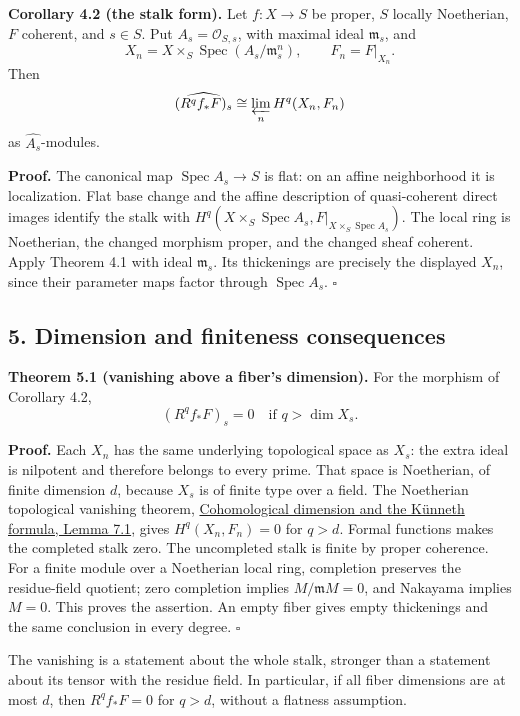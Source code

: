 \documentclass[11pt]{article}
\begin{document}
\textbf{Corollary 4.2 (the stalk form).} Let \(f:X\to S\) be proper,
\(S\) locally Noetherian, \(F\) coherent, and \(s\in S\). Put
\(A_s=\mathcal O_{S,s}\), with maximal ideal \(\mathfrak m_s\), and \[
X_n=X\times_S\operatorname{Spec}(A_s/\mathfrak m_s^n),\qquad F_n=F|_{X_n}.
\] Then \[
\widehat{(R^qf_*F)_s}\cong\varprojlim_n H^q(X_n,F_n)
\] as \(\widehat{A_s}\)-modules.

\textbf{Proof.} The canonical map \(\operatorname{Spec}A_s\to S\) is
flat: on an affine neighborhood it is localization. Flat base change and
the affine description of quasi-coherent direct images identify the
stalk with
\(H^q(X\times_S\operatorname{Spec}A_s,F|_{X\times_S\operatorname{Spec}A_s})\).
The local ring is Noetherian, the changed morphism proper, and the
changed sheaf coherent. Apply Theorem 4.1 with ideal \(\mathfrak m_s\).
Its thickenings are precisely the displayed \(X_n\), since their
parameter maps factor through \(\operatorname{Spec}A_s\). \(\square\)

\subsection{5. Dimension and finiteness
consequences}\label{dimension-and-finiteness-consequences}

\textbf{Theorem 5.1 (vanishing above a fiber's dimension).} For the
morphism of Corollary 4.2, \[
(R^qf_*F)_s=0\quad\text{if }q>\dim X_s.
\]

\textbf{Proof.} Each \(X_n\) has the same underlying topological space
as \(X_s\): the extra ideal is nilpotent and therefore belongs to every
prime. That space is Noetherian, of finite dimension \(d\), because
\(X_s\) is of finite type over a field. The Noetherian topological
vanishing theorem,
\href{https://kokunoyumeto.github.io/open-math-courses/courses/ag-etale-cohomology/cohomological-dimension-and-the-kunneth-formula.html\#7-the-bound-for-all-finite-type-schemes}{Cohomological
dimension and the Künneth formula, Lemma 7.1}, gives \(H^q(X_n,F_n)=0\)
for \(q>d\). Formal functions makes the completed stalk zero. The
uncompleted stalk is finite by proper coherence. For a finite module
over a Noetherian local ring, completion preserves the residue-field
quotient; zero completion implies \(M/\mathfrak mM=0\), and Nakayama
implies \(M=0\). This proves the assertion. An empty fiber gives empty
thickenings and the same conclusion in every degree. \(\square\)

The vanishing is a statement about the whole stalk, stronger than a
statement about its tensor with the residue field. In particular, if all
fiber dimensions are at most \(d\), then \(R^qf_*F=0\) for \(q>d\),
without a flatness assumption.
\end{document}
